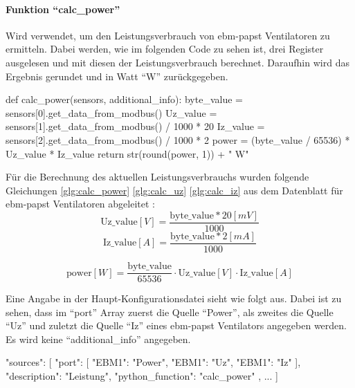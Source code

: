 \paragraph{Funktion \enquote{calc\_power}}
Wird verwendet, um den Leistungsverbrauch von ebm-papst Ventilatoren zu ermitteln. Dabei werden, wie im folgenden Code zu sehen ist, drei Register ausgelesen und mit diesen der Leistungsverbrauch berechnet. Daraufhin wird das Ergebnis gerundet und in Watt \enquote{W} zurückgegeben.

\begin{pythoncode}
def calc_power(sensors, additional_info):
	byte_value = sensors[0].get_data_from_modbus()
	Uz_value = sensors[1].get_data_from_modbus() / 1000 * 20
	Iz_value = sensors[2].get_data_from_modbus() / 1000 * 2
	power = (byte_value / 65536) * Uz_value * Iz_value
	return str(round(power, 1)) + " W"
\end{pythoncode}

Für die Berechnung des aktuellen Leistungsverbrauchs wurden folgende Gleichungen \eqref{glg:calc_power} \eqref{glg:calc_uz} \eqref{glg:calc_iz} aus dem Datenblatt für ebm-papst Ventilatoren abgeleitet \cite[vgl.][95,126]{ebmpapst:2020}: 
\begin{equation}
	\text{Uz\_value} \left[V\right] = \frac{\text{byte\_value} * 20 \left[mV\right]}{1000}
	\label{glg:calc_uz}
\end{equation} 
\begin{equation}
	\text{Iz\_value} \left[A\right] = \frac{\text{byte\_value} * 2 \left[mA\right]}{1000}
	\label{glg:calc_iz}
\end{equation} 

\begin{equation}
	\text{power} \left[W\right] = \frac{\text{byte\_value}}{65536} \cdot \text{Uz\_value}  \left[V\right] \cdot \text{Iz\_value} \left[A\right]
	\label{glg:calc_power}
\end{equation} 

Eine Angabe in der Haupt-Konfigurationsdatei sieht wie folgt aus. Dabei ist zu sehen, dass im \enquote{port} Array zuerst die Quelle \enquote{Power}, als zweites die Quelle \enquote{Uz} und zuletzt die Quelle \enquote{Iz} eines ebm-papst Ventilators angegeben werden. Es wird keine \enquote{additional\_info} angegeben.

\begin{jsoncode}
"sources": [
	{
		"port": [
			{"EBM1": "Power"},
			{"EBM1": "Uz"},
			{"EBM1": "Iz"}
		],
		"description": "Leistung",
		"python_function": "calc_power"
	},
	...
]
\end{jsoncode}



